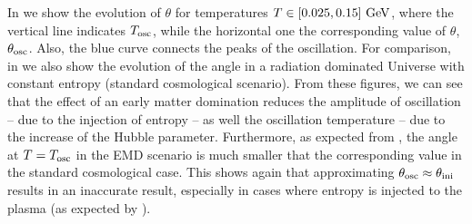 \documentclass[11pt,a4paper]{article}
\begin{document}
In  we show the evolution  of $\theta$ for temperatures $T \in [0.025,0.15]~{\rm GeV}$, where the vertical line indicates $T_{\rm osc}{}$, while the horizontal one the corresponding value of $\theta$, $\theta_{\rm osc}{}$. Also, the blue curve connects the peaks of the oscillation. For comparison, in  we also show the evolution of the angle in a radiation dominated Universe with constant entropy (\ie standard cosmological scenario). From these figures, we can see that the effect of an early matter domination reduces the amplitude of oscillation -- due to the injection of entropy -- as well the oscillation temperature -- due to the increase of the Hubble parameter. Furthermore, as expected from , the angle at $T=T_{\rm osc}{}$ in the EMD scenario is much smaller that the corresponding value in the standard cosmological case. This shows again that approximating $\theta_{\rm osc}{} \approx \theta_{\rm ini}{}$ results in an inaccurate result, especially in cases where entropy is injected to the plasma (as expected by ).
\end{document}
